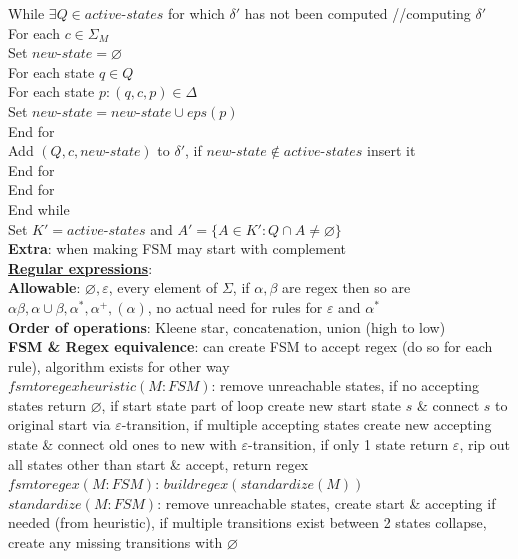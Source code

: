 \documentclass[a4paper]{article}
\begin{document}
\begin{multicols}{2}
        While $\exists Q \in active\mbox{-}states$ for which $\delta'$ has not been computed //computing $\delta'$\\
        For each $c \in \Sigma_M$\\
        Set $new\mbox{-}state = \varnothing$\\
        For each state $q \in Q$\\
        For each state $p : (q, c, p) \in \Delta$\\
        Set $new\mbox{-}state = new\mbox{-}state \cup eps(p)$\\
        End for\\
        Add $(Q, c, new\mbox{-}state)$ to $\delta'$, if $new\mbox{-}state \notin active\mbox{-}states$ insert it\\
        End for\\
        End for\\
        End while\\
        Set $K' = active\mbox{-}states$ and $A' = \{ A \in K' : Q \cap A \neq \varnothing \}$\\
        \textbf{Extra}: when making FSM may start with complement\\
        \underline{\textbf{Regular expressions}}:\\
        \textbf{Allowable}: $\varnothing, \varepsilon$, every element of $\Sigma$, if $\alpha, \beta$ are regex then so are $\alpha\beta, \alpha\cup\beta, \alpha^*, \alpha^+, (\alpha)$, no actual need for rules for $\varepsilon$ and $\alpha^*$\\
        \textbf{Order of operations}: Kleene star, concatenation, union (high to low)\\
        \textbf{FSM \& Regex equivalence}: can create FSM to accept regex (do so for each rule), algorithm exists for other way\\
        \boldmath$fsmtoregexheuristic(M: FSM)$\unboldmath: remove unreachable states, if no accepting states return $\varnothing$, if start state part of loop create new start state $s$ \& connect $s$ to original start via $\varepsilon$-transition, if multiple accepting states create new accepting state \& connect old ones to new with $\varepsilon$-transition, if only 1 state return $\varepsilon$, rip out all states other than start \& accept, return regex\\
        \boldmath$fsmtoregex(M: FSM)$\unboldmath: $buildregex(standardize(M))$\\
        \boldmath$standardize(M: FSM)$\unboldmath: remove unreachable states, create start \& accepting if needed (from heuristic), if multiple transitions exist between 2 states collapse, create any missing transitions with $\varnothing$\\

\end{multicols}
\end{document}
